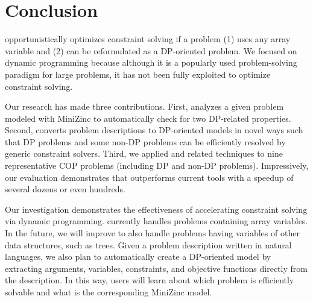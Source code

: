 \section{Conclusion}

\tool opportunistically optimizes constraint solving if a problem (1) uses any array variable and (2) can be reformulated as a DP-oriented problem. We focused on dynamic programming because although it is a popularly used problem-solving paradigm for large problems, it has not been fully exploited to 
optimize constraint solving. 

Our research has made three contributions. First, \tool analyzes a given problem modeled with MiniZinc to automatically check for two DP-related properties. Second, \tool converts problem descriptions to DP-oriented models in novel ways such that DP problems and some non-DP problems can be efficiently resolved by generic constraint solvers. 
Third, we applied \tool and related techniques to nine representative COP problems (including DP and non-DP problems). Impressively, our evaluation demonstrates that \tool outperforms current tools with a speedup of several dozens or even hundreds.

Our investigation demonstrates the effectiveness of accelerating constraint solving via dynamic programming. \tool currently handles problems containing array variables. In the future, we will improve \tool to also handle problems having variables of other data structures, such as trees. 
Given a problem description written in natural languages, we also plan to automatically create a DP-oriented model by extracting arguments, variables, constraints, and objective functions directly from the description. In this way, users will learn about which problem is efficiently solvable and what is the corresponding MiniZinc model. 


